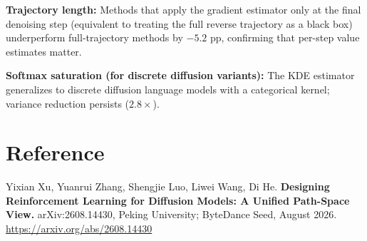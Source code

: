 \documentclass[10pt,twocolumn]{article}
\begin{document}
\textbf{Trajectory length:} Methods that apply the gradient estimator
only at the final denoising step (equivalent to treating the full
reverse trajectory as a black box) underperform full-trajectory
methods by $-5.2$ pp, confirming that per-step value estimates matter.

\textbf{Softmax saturation (for discrete diffusion variants):} The KDE
estimator generalizes to discrete diffusion language models with a
categorical kernel; variance reduction persists ($2.8\times$).

\section*{Reference}

Yixian Xu, Yuanrui Zhang, Shengjie Luo, Liwei Wang, Di He.
\textbf{Designing Reinforcement Learning for Diffusion Models:
A Unified Path-Space View.}
arXiv:2608.14430, Peking University; ByteDance Seed, August 2026.
\url{https://arxiv.org/abs/2608.14430}
\end{document}
